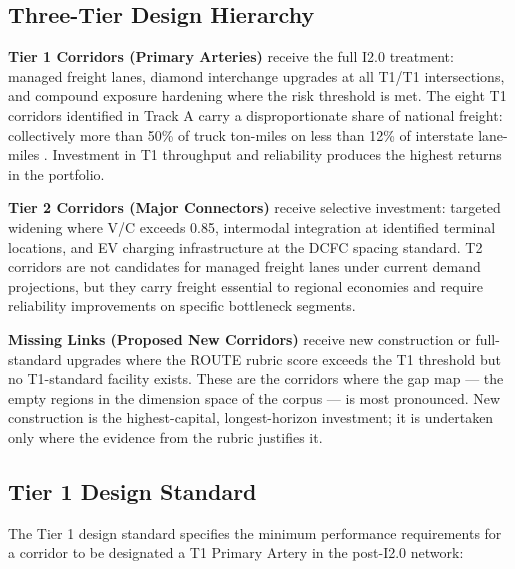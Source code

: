 \subsection{Three-Tier Design Hierarchy}

\textbf{Tier 1 Corridors (Primary Arteries)} receive the full I2.0 treatment: managed freight lanes, diamond interchange upgrades at all T1/T1 intersections, and compound exposure hardening where the risk threshold is met. The eight T1 corridors identified in Track A carry a disproportionate share of national freight: collectively more than 50\% of truck ton-miles on less than 12\% of interstate lane-miles \citep{ROUTE_A1}. Investment in T1 throughput and reliability produces the highest returns in the portfolio.

\textbf{Tier 2 Corridors (Major Connectors)} receive selective investment: targeted widening where V/C exceeds 0.85, intermodal integration at identified terminal locations, and EV charging infrastructure at the DCFC spacing standard. T2 corridors are not candidates for managed freight lanes under current demand projections, but they carry freight essential to regional economies and require reliability improvements on specific bottleneck segments.

\textbf{Missing Links (Proposed New Corridors)} receive new construction or full-standard upgrades where the ROUTE rubric score exceeds the T1 threshold but no T1-standard facility exists. These are the corridors where the gap map --- the empty regions in the dimension space of the corpus --- is most pronounced. New construction is the highest-capital, longest-horizon investment; it is undertaken only where the evidence from the rubric justifies it.

\subsection{Tier 1 Design Standard}

The Tier 1 design standard specifies the minimum performance requirements for a corridor to be designated a T1 Primary Artery in the post-I2.0 network:

